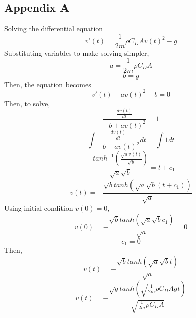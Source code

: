 \documentclass[12pt]{report}
\begin{document}
\subsection*{Appendix A}
\noindent Solving the differential equation
\begin{equation*}
	v'(t) = \frac{1}{2m}\rho C_D A v(t)^2 - g
\end{equation*}
\noindent Substituting variables to make solving simpler,
\begin{equation*}
	a = \frac{1}{2m}\rho C_D A
\end{equation*}
\begin{equation*}
	b = g
\end{equation*}
\noindent Then, the equation becomes
\begin{equation*}
	v'(t) -av(t)^2+b = 0
\end{equation*}
\noindent Then, to solve,
\begin{equation*}
	\frac{\frac{dv(t)}{dt}}{-b+av(t)^2}=1
\end{equation*}
\begin{equation*}
	\int\frac{\frac{dv(t)}{dt}}{-b+av(t)^2}dt=\int1dt
\end{equation*}
\begin{equation*}
	-\frac{tanh^{-1}(\frac{\sqrt{a}v(t)}{\sqrt{b}})}{\sqrt{a}\sqrt{b}}=t+c_1
\end{equation*}
\begin{equation*}
	v(t) = -\frac{\sqrt{b}tanh(\sqrt{a}\sqrt{b}(t+c_1))}{\sqrt{a}}
\end{equation*}
\noindent Using initial condition $v(0) = 0$,
\begin{equation*}
	v(0) = -\frac{\sqrt{b}tanh(\sqrt{a}\sqrt{b}c_1)}{\sqrt{a}} = 0
\end{equation*}
\begin{equation*}
	c_1 = 0
\end{equation*}
\noindent Then, 
\begin{equation*}
	v(t) = -\frac{\sqrt{b}tanh(\sqrt{a}\sqrt{b}t)}{\sqrt{a}}
\end{equation*}
\begin{equation*}
	v(t) = -\frac{\sqrt{g} tanh(\sqrt{\frac{1}{2m}\rho C_D A g}t)}{\sqrt{\frac{1}{2m}\rho C_D A}}
\end{equation*}
\end{document}
